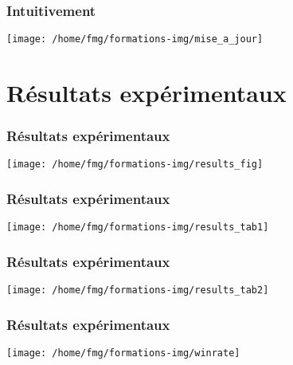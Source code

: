 \documentclass[smaller]{beamer}
\begin{document}

\begin{frame}
  \frametitle{Intuitivement}

  \centerline{\texttt{[image: /home/fmg/formations-img/mise\_a\_jour]}}  

\end{frame}


\section{Résultats expérimentaux}

\begin{frame}
  \frametitle{Résultats expérimentaux}

  \centerline{\texttt{[image: /home/fmg/formations-img/results\_fig]}}

\end{frame}


\begin{frame}
  \frametitle{Résultats expérimentaux}

  \centerline{\texttt{[image: /home/fmg/formations-img/results\_tab1]}}

\end{frame}


\begin{frame}
  \frametitle{Résultats expérimentaux}

  \centerline{\texttt{[image: /home/fmg/formations-img/results\_tab2]}}

\end{frame}


\begin{frame}
  \frametitle{Résultats expérimentaux}

  \centerline{\texttt{[image: /home/fmg/formations-img/winrate]}}

\end{frame}

\end{document}
